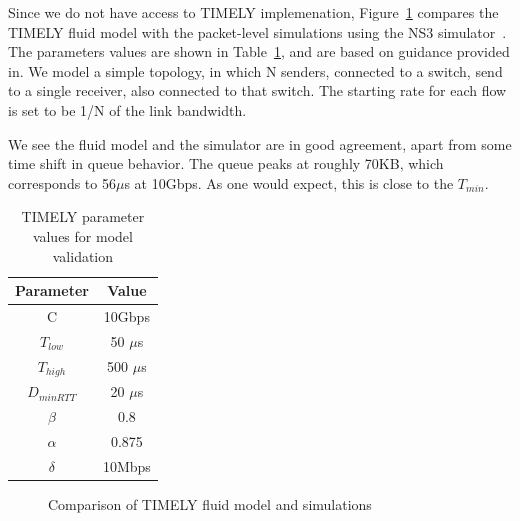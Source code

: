 Since we do not have access to TIMELY implemenation,
Figure~\ref{fig:timely_model_validation} compares the TIMELY fluid model with
the packet-level simulations using the NS3 simulator~\cite{ns3}. The parameters
values are shown in Table~\ref{tab:timely_model_validation}, and are based on
guidance provided in\cite{timely}.  We model a simple topology, in which N
senders, connected to a switch, send to a single receiver, also connected to
that switch. The starting rate for each flow is set to be 1/N of the link
bandwidth. 

We see the fluid model and the simulator are in good agreement, apart from some
time shift in queue behavior. The queue peaks at roughly 70KB, which corresponds
to 56$\mu$s at 10Gbps. As one would expect, this is close to the $T_{min}$.

\begin{table}[t]
\small
\center
\begin{tabular}{c|c}
Parameter & Value \\ \hline
C & 10Gbps \\ 
$T_{low}$ & 50 $\mu$s \\ 
$T_{high}$ & 500 $\mu$s \\
$D_{minRTT}$ & 20 $\mu$s \\
$\beta$ & 0.8 \\
$\alpha$ & 0.875 \\
$\delta$ & 10Mbps
\end{tabular}
\caption{TIMELY parameter values for model validation}
\label{tab:timely_model_validation}
\end{table}

\begin{figure}[t]
\center
{}
\caption{Comparison of TIMELY fluid model and simulations}
\label{fig:timely_model_validation}
\end{figure}

